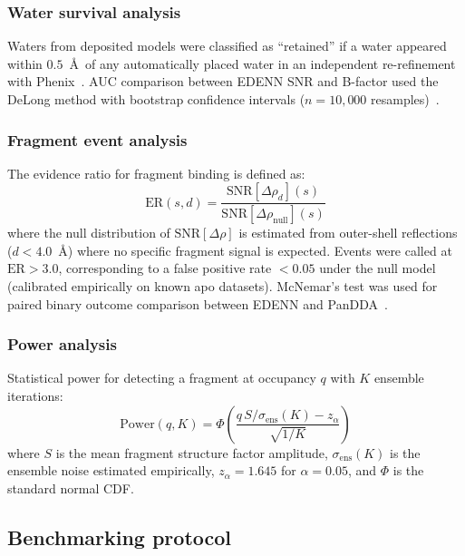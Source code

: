 \documentclass[10pt,twocolumn]{article}
\newcommand{\rhodiff}{\Delta\rho}
\newcommand{\SNR}{\mathrm{SNR}}
\begin{document}
\subsubsection{Water survival analysis}

Waters from deposited models were classified as ``retained'' if a
water appeared within $0.5$~\AA\ of any automatically placed water
in an independent re-refinement with Phenix~\cite{liebschner2019}.
AUC comparison between EDENN SNR and B-factor used the DeLong
method with bootstrap confidence intervals ($n=10{,}000$
resamples)~\cite{delong1988}.

\subsubsection{Fragment event analysis}

The evidence ratio for fragment binding is defined as:
\begin{equation}
  \mathrm{ER}(s,d)
  = \frac{\SNR[\rhodiff_d](s)}{\SNR[\rhodiff_{\mathrm{null}}](s)}
  \label{eq:er}
\end{equation}
where the null distribution of $\SNR[\rhodiff]$ is estimated from
outer-shell reflections ($d < 4.0$~\AA) where no specific fragment
signal is expected.
Events were called at $\mathrm{ER} > 3.0$, corresponding to a
false positive rate $< 0.05$ under the null model (calibrated
empirically on known apo datasets).
McNemar's test was used for paired binary outcome comparison
between EDENN and PanDDA~\cite{mcnemar1947}.

\subsubsection{Power analysis}

Statistical power for detecting a fragment at occupancy $q$ with
$K$ ensemble iterations:
\begin{equation}
  \mathrm{Power}(q,K) = \Phi\!\left(
    \frac{q\,S/\sigma_{\mathrm{ens}}(K) - z_\alpha}{\sqrt{1/K}}
  \right)
  \label{eq:power}
\end{equation}
where $S$ is the mean fragment structure factor amplitude,
$\sigma_{\mathrm{ens}}(K)$ is the ensemble noise estimated
empirically, $z_\alpha = 1.645$ for $\alpha = 0.05$, and $\Phi$
is the standard normal CDF.

\subsection{Benchmarking protocol}
\end{document}
